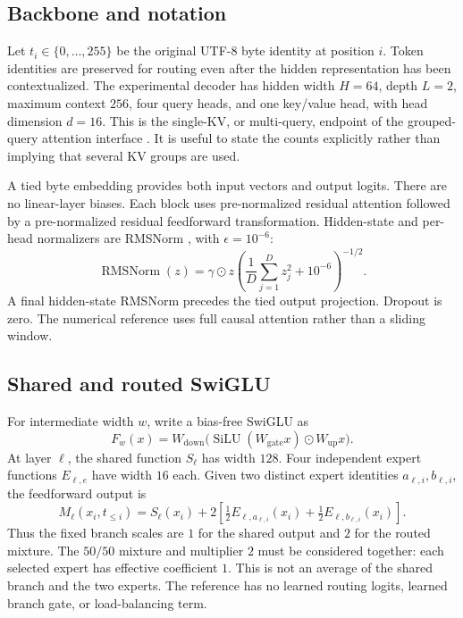 \documentclass{article}
\newcommand{\RMS}{\operatorname{RMSNorm}}
\newcommand{\silu}{\operatorname{SiLU}}
\begin{document}
\subsection{Backbone and notation}
Let $t_i\in\{0,\ldots,255\}$ be the original UTF-8 byte identity at position $i$. Token identities are preserved for routing even after the hidden representation has been contextualized. The experimental decoder has hidden width $H=64$, depth $L=2$, maximum context $256$, four query heads, and one key/value head, with head dimension $d=16$. This is the single-KV, or multi-query, endpoint of the grouped-query attention interface \citep{ainslie2023gqa}. It is useful to state the counts explicitly rather than implying that several KV groups are used.

A tied byte embedding provides both input vectors and output logits. There are no linear-layer biases. Each block uses pre-normalized residual attention followed by a pre-normalized residual feedforward transformation. Hidden-state and per-head normalizers are RMSNorm \citep{zhang2019rmsnorm}, with $\epsilon=10^{-6}$:
\begin{equation}
 \RMS(z)=\gamma\odot z\left(\frac{1}{D}\sum_{j=1}^{D}z_j^2+10^{-6}\right)^{-1/2}.
\end{equation}
A final hidden-state RMSNorm precedes the tied output projection. Dropout is zero. The numerical reference uses full causal attention rather than a sliding window.

\subsection{Shared and routed SwiGLU}
For intermediate width $w$, write a bias-free SwiGLU \citep{shazeer2020glu} as
\begin{equation}
 F_w(x)=W_{\mathrm{down}}\bigl(\silu(W_{\mathrm{gate}}x)\odot W_{\mathrm{up}}x\bigr).
\end{equation}
At layer $\ell$, the shared function $S_\ell$ has width $128$. Four independent expert functions $E_{\ell,e}$ have width $16$ each. Given two distinct expert identities $a_{\ell,i},b_{\ell,i}$, the feedforward output is
\begin{equation}
 M_\ell(x_i,t_{\le i})=S_\ell(x_i)+2\left[\tfrac12 E_{\ell,a_{\ell,i}}(x_i)+\tfrac12 E_{\ell,b_{\ell,i}}(x_i)\right].
 \label{eq:mlp}
\end{equation}
Thus the fixed branch scales are $1$ for the shared output and $2$ for the routed mixture. The $50/50$ mixture and multiplier $2$ must be considered together: each selected expert has effective coefficient $1$. This is not an average of the shared branch and the two experts. The reference has no learned routing logits, learned branch gate, or load-balancing term.
\end{document}
